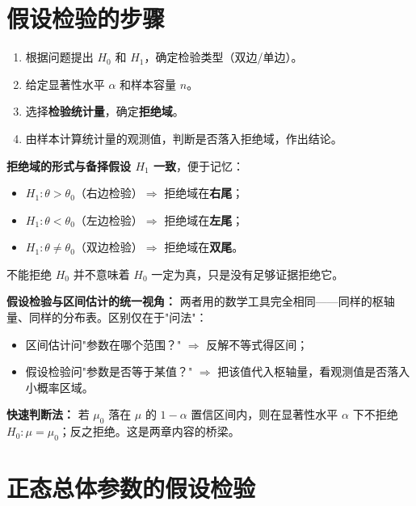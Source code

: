 ﻿\documentclass[lang=cn,11pt]{elegantbook}
\begin{document}
\section{假设检验的步骤} \label{sec:ht-steps}

\begin{property}[假设检验的四步流程]\label{prop:ht-steps}
\begin{enumerate}
    \item 根据问题提出 \(H_0\) 和 \(H_1\)，确定检验类型（双边/单边）。
    \item 给定显著性水平 \(\alpha\) 和样本容量 \(n\)。
    \item 选择\textbf{检验统计量}，确定\textbf{拒绝域}。
    \item 由样本计算统计量的观测值，判断是否落入拒绝域，作出结论。
\end{enumerate}
\end{property}

\begin{note}
\textbf{拒绝域的形式与备择假设 \(H_1\) 一致}，便于记忆：
\begin{itemize}
    \item \(H_1\colon \theta > \theta_0\)（右边检验）\(\Longrightarrow\) 拒绝域在\textbf{右尾}；
    \item \(H_1\colon \theta < \theta_0\)（左边检验）\(\Longrightarrow\) 拒绝域在\textbf{左尾}；
    \item \(H_1\colon \theta \neq \theta_0\)（双边检验）\(\Longrightarrow\) 拒绝域在\textbf{双尾}。
\end{itemize}
不能拒绝 \(H_0\) 并不意味着 \(H_0\) 一定为真，只是没有足够证据拒绝它。
\end{note}

\begin{note}
\textbf{假设检验与区间估计的统一视角：} 两者用的数学工具完全相同——同样的枢轴量、同样的分布表。区别仅在于"问法"：
\begin{itemize}
    \item 区间估计问"参数在哪个范围？" $\Longrightarrow$ 反解不等式得区间；
    \item 假设检验问"参数是否等于某值？" $\Longrightarrow$ 把该值代入枢轴量，看观测值是否落入小概率区域。
\end{itemize}
\textbf{快速判断法：} 若 $\mu_0$ 落在 $\mu$ 的 $1-\alpha$ 置信区间内，则在显著性水平 $\alpha$ 下不拒绝 $H_0\colon\mu=\mu_0$；反之拒绝。这是两章内容的桥梁。
\end{note}


\section{正态总体参数的假设检验} \label{sec:ht-normal}
\end{document}
